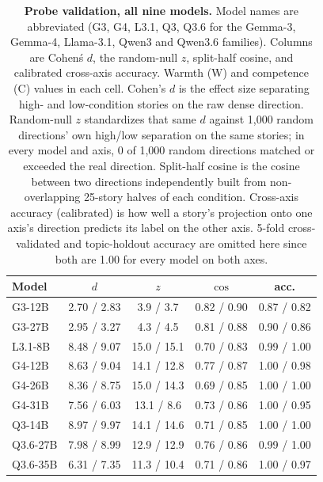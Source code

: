 \begin{table}[tb]
\centering
\footnotesize
\setlength{\tabcolsep}{3pt}
\begin{tabular}{@{}lcccc@{}}
\toprule
Model & $d$ & $z$ & $\cos$ & acc. \\
\midrule
G3-12B & 2.70 / 2.83 & 3.9 / 3.7 & 0.82 / 0.90 & 0.87 / 0.82 \\
G3-27B & 2.95 / 3.27 & 4.3 / 4.5 & 0.81 / 0.88 & 0.90 / 0.86 \\
L3.1-8B & 8.48 / 9.07 & 15.0 / 15.1 & 0.70 / 0.83 & 0.99 / 1.00 \\
G4-12B & 8.63 / 9.04 & 14.1 / 12.8 & 0.77 / 0.87 & 1.00 / 0.98 \\
G4-26B & 8.36 / 8.75 & 15.0 / 14.3 & 0.69 / 0.85 & 1.00 / 1.00 \\
G4-31B & 7.56 / 6.03 & 13.1 / 8.6 & 0.73 / 0.86 & 1.00 / 0.95 \\
Q3-14B & 8.97 / 9.97 & 14.1 / 14.6 & 0.71 / 0.85 & 1.00 / 1.00 \\
Q3.6-27B & 7.98 / 8.99 & 12.9 / 12.9 & 0.76 / 0.86 & 0.99 / 1.00 \\
Q3.6-35B & 6.31 / 7.35 & 11.3 / 10.4 & 0.71 / 0.86 & 1.00 / 0.97 \\
\bottomrule
\end{tabular}%
\caption{\textbf{Probe validation, all nine models.} Model names are abbreviated (G3, G4, L3.1, Q3, Q3.6 for the Gemma-3, Gemma-4, Llama-3.1, Qwen3 and Qwen3.6 families). Columns are Cohen\'s $d$, the random-null $z$, split-half cosine, and calibrated cross-axis accuracy. Warmth (W) and competence (C) values in each cell. Cohen's $d$ is the effect size separating high- and low-condition stories on the raw dense direction. Random-null $z$ standardizes that same $d$ against 1,000 random directions' own high/low separation on the same stories; in every model and axis, 0 of 1,000 random directions matched or exceeded the real direction. Split-half cosine is the cosine between two directions independently built from non-overlapping 25-story halves of each condition. Cross-axis accuracy (calibrated) is how well a story's projection onto one axis's direction predicts its label on the other axis. 5-fold cross-validated and topic-holdout accuracy are omitted here since both are 1.00 for every model on both axes.}
\label{tab:probe_validation}
\end{table}
